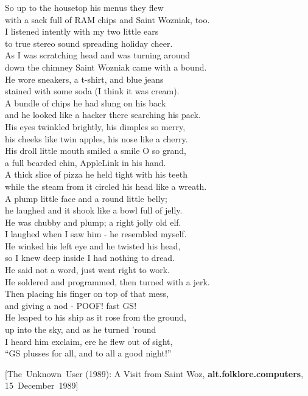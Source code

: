 \documentclass{report}
\newcommand{\citeusenet}[7]
{\rmfamily\footnotesize[\mbox{#1} (#3): #4, {\bfseries#5}, \mbox{#7 #3}]}
\newenvironment{usenet}{\raggedright\small\ttfamily}{\rmfamily}
\begin{document}
\begin{usenet}
		So up to the housetop his menus they flew\\
		with a sack full of RAM chips and Saint Wozniak, too.\\
		I listened intently with my two little ears\\
		to true stereo sound spreading holiday cheer.\\
		As I was scratching head and was turning around\\
		down the chimney Saint Wozniak came with a bound.\\
		He wore sneakers, a t-shirt, and blue jeans\\
		stained with some soda (I think it was cream).\\
		A bundle of chips he had slung on his back\\
		and he looked like a hacker there searching his pack.\\
		His eyes twinkled brightly, his dimples so merry,\\
		his cheeks like twin apples, his nose like a cherry.\\
		His droll little mouth smiled a smile O so grand,\\
		a full bearded chin, AppleLink in his hand.\\
		A thick slice of pizza he held tight with his teeth\\
		while the steam from it circled his head like a wreath.\\
		A plump little face and a round little belly;\\
		he laughed and it shook like a bowl full of jelly.\\
		He was chubby and plump; a right jolly old elf.\\
		I laughed when I saw him - he resembled myself.\\
		He winked his left eye and he twisted his head,\\
		so I knew deep inside I had nothing to dread.\\
		He said not a word, just went right to work.\\
		He soldered and programmed, then turned with a jerk.\\
		Then placing his finger on top of that mess,\\
		and giving a nod - POOF! fast GS!\\
		He leaped to his ship as it rose from the ground,\\
		up into the sky, and as he turned 'round\\
		I heard him exclaim, ere he flew out of sight,\\
		``GS plusses for all, and to all a good night!''

		\citeusenet{The Unknown User}{unknown@ucscb.ucsc.edu}{1989}{A Visit from Saint Woz}{alt.folklore.computers}{\_mXEGBQNF\_A}
			{15 December}
	\end{usenet}
\end{document}

